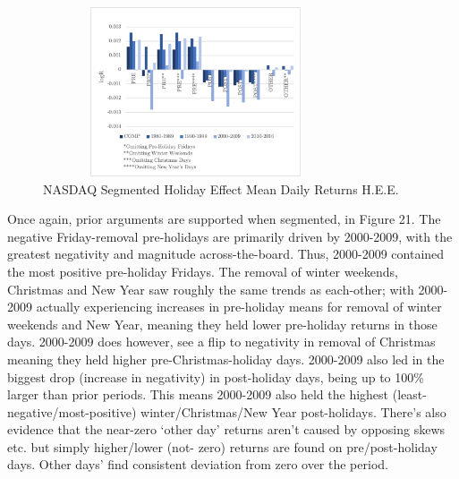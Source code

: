 \documentclass[11pt, english]{article}
\begin{document}
	\begin{figure}[H]
        \begin{center}
                \includegraphics[width=9cm,height=5cm]{NAS-HE3.png}              
                \caption{NASDAQ Segmented Holiday Effect Mean Daily Returns H.E.E.}    
        \end{center}
        \end{figure}

	Once again, prior arguments are supported when segmented, in Figure 21. The negative Friday-removal pre-holidays are primarily driven by 2000-2009, with the greatest negativity and magnitude across-the-board. Thus, 2000-2009 contained the most positive pre-holiday Fridays. The removal of winter weekends, Christmas and New Year saw roughly the same trends as each-other; with 2000-2009 actually experiencing increases in pre-holiday means for removal of winter weekends and New Year, meaning they held lower pre-holiday returns in those days. 2000-2009 does however, see a flip to negativity in removal of Christmas meaning they held higher pre-Christmas-holiday days. 2000-2009 also led in the biggest drop (increase in negativity) in post-holiday days, being up to 100\% larger than prior periods. This means 2000-2009 also held the highest (least-negative/most-positive) winter/Christmas/New Year post-holidays. There’s also evidence that the near-zero `other day' returns aren’t caused by opposing skews etc. but simply higher/lower (not- zero) returns are found on pre/post-holiday days. Other days’ find consistent deviation from zero over the period.

	\newpage
\end{document}
